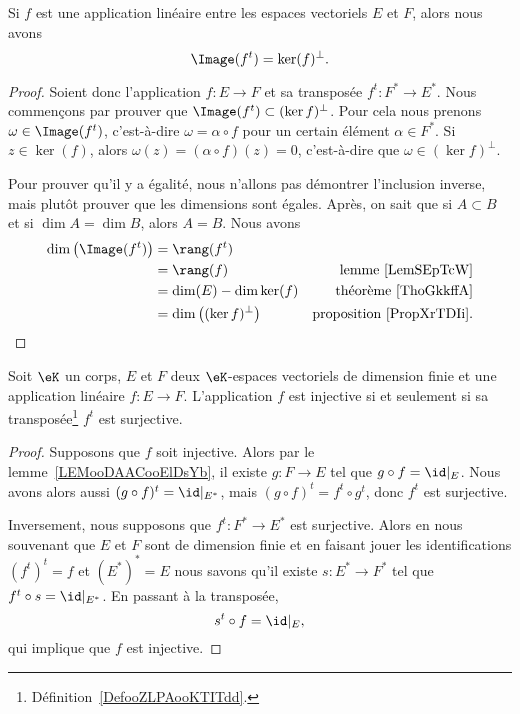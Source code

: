 \begin{proposition}        \label{PropWOPIooBHFDdP}
    Si \( f\) est une application linéaire entre les espaces vectoriels \( E\) et \( F\), alors nous avons
    \begin{equation}
        \Image(f^t)=\ker(f)^{\perp}.
    \end{equation}
\end{proposition}

\begin{proof}
    Soient donc l'application \( f\colon E\to F\) et sa transposée \( f^t\colon F^*\to E^*\). Nous commençons par prouver que \( \Image(f^{t})\subset(\ker f)^{\perp}\). Pour cela nous prenons \( \omega\in \Image(f^t)\), c'est-à-dire \( \omega=\alpha\circ f\) pour un certain élément \( \alpha\in F^*\). Si \( z\in\ker(f)\), alors \( \omega(z)=(\alpha\circ f)(z)=0\), c'est-à-dire que \( \omega\in (\ker f)^{\perp}\).

    Pour prouver qu'il y a égalité, nous n'allons pas démontrer l'inclusion inverse, mais plutôt prouver que les dimensions sont égales. Après, on sait que si \( A\subset B\) et si \( \dim A=\dim B\), alors \( A=B\). Nous avons
    \begin{subequations}
        \begin{align}
            \dim\big( \Image(f^t) \big)&=\rang(f^t)\\
            &=\rang(f)  &\text{lemme~\ref{LemSEpTcW}}\\
            &=\dim(E)-\dim\ker(f)   &\text{théorème~\ref{ThoGkkffA}}\\
            &=\dim\big( (\ker f)^{\perp} \big)  &\text{proposition~\ref{PropXrTDIi}}.
        \end{align}
    \end{subequations}
\end{proof}

\begin{lemma}
    Soit \( \eK\) un corps, \( E\) et \( F\) deux \( \eK\)-espaces vectoriels de dimension finie et une application linéaire \( f\colon E\to F\). L'application \( f\) est injective si et seulement si sa transposée\footnote{Définition~\ref{DefooZLPAooKTITdd}.} \( f^t\) est surjective.
\end{lemma}

\begin{proof}
    Supposons que \( f\) soit injective. Alors par le lemme~\ref{LEMooDAACooElDsYb}, il existe \( g\colon F\to E\) tel que \( g\circ f=\id|_E\). Nous avons alors aussi \( (g\circ f)^t=\id|_{E^*}\), mais \( (g\circ f)^t=f^t\circ g^t\), donc \( f^t\) est surjective.

    Inversement, nous supposons que \( f^t\colon F^*\to E^*\) est surjective. Alors en nous souvenant que \( E\) et \( F\) sont de dimension finie et en faisant jouer les identifications \( (f^t)^t=f\) et \( (E^*)^*=E\) nous savons qu'il existe \( s\colon E^*\to F^*\) tel que \( f^t\circ s=\id|_{E^*}\). En passant à la transposée,
    \begin{equation}
        s^t\circ f=\id|_{E},
    \end{equation}
    qui implique que \( f\) est injective.
\end{proof}

